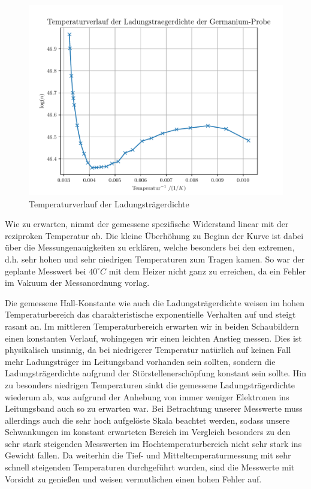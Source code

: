 \begin{figure}[htbp] 
     \includegraphics[scale=0.7]{temp_n.pdf}
  \caption{Temperaturverlauf der Ladungsträgerdichte}
  \label{n}
\end{figure}

Wie zu erwarten, nimmt der gemessene spezifische Widerstand linear mit der reziproken Temperatur ab. Die kleine Überhöhung zu Beginn der Kurve ist dabei über die Messungenauigkeiten zu erklären, welche besonders bei den extremen, d.h. sehr hohen und sehr niedrigen Temperaturen zum Tragen kamen. So war der geplante Messwert bei $40^{\circ}C$ mit dem Heizer nicht ganz zu erreichen, da ein Fehler im Vakuum der Messanordnung vorlag.  

Die gemessene Hall-Konstante wie auch die Ladungsträgerdichte weisen im hohen Temperaturbereich das charakteristische exponentielle Verhalten auf und steigt rasant an. Im mittleren Temperaturbereich erwarten wir in beiden Schaubildern einen konstanten Verlauf, wohingegen wir einen leichten Anstieg messen. Dies ist physikalisch unsinnig, da bei niedrigerer Temperatur natürlich auf keinen Fall mehr Ladungsträger im Leitungsband vorhanden sein sollten, sondern die Ladungsträgerdichte aufgrund der Störstellenerschöpfung konstant sein sollte. Hin zu besonders niedrigen Temperaturen sinkt die gemessene Ladungsträgerdichte wiederum ab, was aufgrund der Anhebung von immer weniger Elektronen ins Leitungsband auch so zu erwarten war.
Bei Betrachtung unserer Messwerte muss allerdings auch die sehr hoch aufgelöste Skala beachtet werden, sodass unsere Schwankungen im konstant erwarteten Bereich im Vergleich besonders zu den sehr stark steigenden Messwerten im Hochtemperaturbereich nicht sehr stark ins Gewicht fallen. Da weiterhin die Tief- und Mitteltemperaturmessung mit sehr schnell steigenden Temperaturen durchgeführt wurden, sind die Messwerte mit Vorsicht zu genießen und weisen vermutlichen einen hohen Fehler auf.

